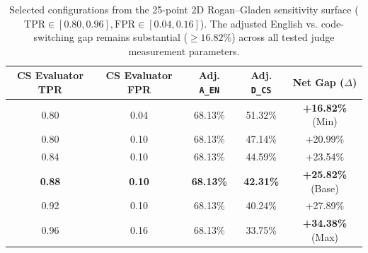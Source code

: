 \begin{table}[t]
\centering
\small
\begin{tabular}{ccccc}
\toprule
\textbf{CS Evaluator TPR} & \textbf{CS Evaluator FPR} & \textbf{Adj. \texttt{A\_EN}} & \textbf{Adj. \texttt{D\_CS}} & \textbf{Net Gap ($\Delta$)} \\
\midrule
0.80 & 0.04 & 68.13\% & 51.32\% & \textbf{+16.82\%} (Min) \\
0.80 & 0.10 & 68.13\% & 47.14\% & +20.99\% \\
0.84 & 0.10 & 68.13\% & 44.59\% & +23.54\% \\
\textbf{0.88} & \textbf{0.10} & \textbf{68.13\%} & \textbf{42.31\%} & \textbf{+25.82\%} (Base) \\
0.92 & 0.10 & 68.13\% & 40.24\% & +27.89\% \\
0.96 & 0.16 & 68.13\% & 33.75\% & \textbf{+34.38\%} (Max) \\
\bottomrule
\end{tabular}
\caption{Selected configurations from the 25-point 2D Rogan--Gladen sensitivity surface ($\text{TPR} \in [0.80, 0.96], \text{FPR} \in [0.04, 0.16]$). The adjusted English vs. code-switching gap remains substantial ($\ge 16.82\%$) across all tested judge measurement parameters.}
\label{tab:evaluator_sensitivity}
\end{table}
